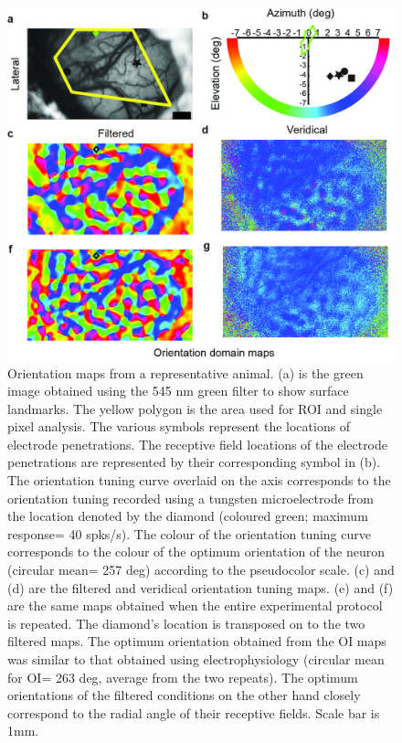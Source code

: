 							\begin{figure}
								
								\includegraphics[width=\linewidth]{rb/rep_image.jpg}
								\caption{Orientation maps from a representative animal. (a) is the green image obtained using the 545 nm green filter to show surface landmarks. The yellow polygon is the area used for ROI and single pixel analysis. The various symbols represent the locations of electrode penetrations. The receptive field locations of the electrode penetrations are represented by their corresponding symbol in (b). The orientation tuning curve overlaid on the axis corresponds to the orientation tuning recorded using a tungsten microelectrode from the location denoted by the diamond (coloured green; maximum response= 40 spks/s). The colour of the orientation tuning curve corresponds to the colour of the optimum orientation of the neuron (circular mean= 257 deg) according to the pseudocolor scale. (c) and (d) are the filtered and veridical orientation tuning maps. (e) and (f) are the same maps obtained when the entire experimental protocol is repeated. The diamond’s location is transposed on to the two filtered maps. The optimum orientation obtained from the OI maps was similar to that obtained using electrophysiology (circular mean for OI= 263 deg, average from the two repeats). The optimum orientations of the filtered conditions on the other hand closely correspond to the radial angle of their receptive fields. Scale bar is 1mm.}
								\label{fig:fig4}
							\end{figure}
			
